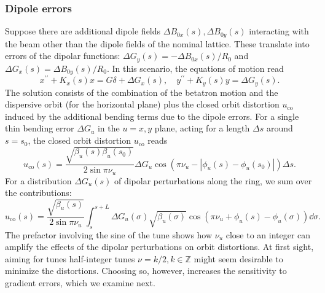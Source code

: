 \subsubsection{Dipole errors}
    Suppose there are additional dipole fields $\Delta B_{0x}(s), \Delta B_{0y}(s)$ interacting with the beam other than the dipole fields of the nominal lattice. These translate into errors of the dipolar functions: $\Delta G_y(s)=-\Delta B_{0x}(s)/R_0$ and $\Delta G_x(s)=\Delta B_{0y}(s)/R_0$. In this scenario, the equations of motion read
    \begin{equation}
        x^{\prime\prime}+K_x(s)x=G\delta + \Delta G_x(s), \quad
        y^{\prime\prime}+K_y(s)y = \Delta G_y(s).
        \label{eq:dip_errEOM}
    \end{equation}
    The solution consists of the combination of the betatron motion and the dispersive orbit (for the horizontal plane) plus the closed orbit distortion $u_{\text{co}}$ induced by the additional bending terms due to the dipole errors. For a single thin bending error $\Delta G_u$ in the $u=x,y$ plane, acting for a length $\Delta s$ around $s=s_0$, the closed orbit distortion $u_{\text{co}}$ reads
    \begin{equation}
        u_{\text{co}}(s) = \frac{\sqrt{\beta_u(s)\beta_u(s_0)}}{2\sin\pi\nu_u}\Delta G_u\cos( \pi\nu_u - |\phi_u(s)-\phi_u(s_0)|)\Delta s.
        \label{eq:cod}
    \end{equation}
    For a distribution $\Delta G_u(s)$ of dipolar perturbations along the ring, we sum over the contributions:
    \begin{equation}
        u_{\text{co}}(s) = \frac{\sqrt{\beta_u(s)}}{2\sin\pi\nu_u}\int_{s}^{s+L} \Delta G_u(\sigma)\sqrt{\beta_u(\sigma)}\cos(\pi\nu_u + \phi_u(s) - \phi_u(\sigma))\dd{\sigma}.
        \label{eq:co_dist}
    \end{equation}
    The prefactor involving the sine of the tune shows how $\nu_{u}$ close to an integer can amplify the effects of the dipolar perturbations on orbit distortions. At first sight, aiming for tunes half-integer tunes $\nu=k/2, k\in\mathbb{Z}$ might seem desirable to minimize the distortions. Choosing so, however, increases the sensitivity to gradient errors, which we examine next.

